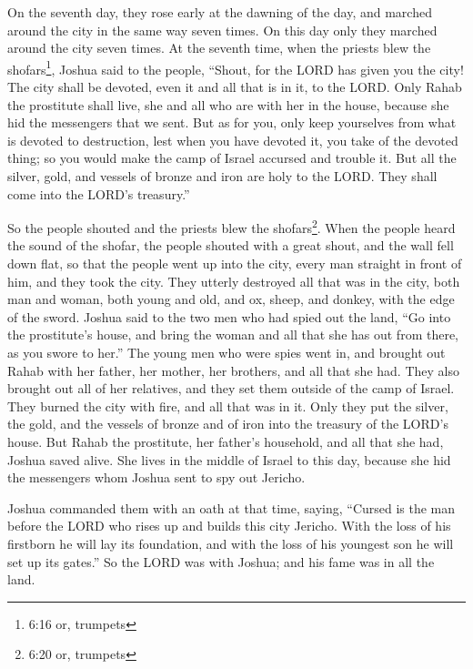 \myverse{}On the seventh day, they rose early at the dawning of the day,
and marched around the city in the same way seven times. On this day only they marched around the city
seven times.
\myverse{}At the seventh time, when the priests blew the shofars\footnote{6:16 or, trumpets},
Joshua said to the people, “Shout, for the LORD has given you the city!
\myverse{}The city shall be devoted, even it and all that is in it, to the LORD. Only
Rahab the prostitute shall live, she and all who are with her in the house, because she hid the messengers
that we sent.
\myverse{}But as for you, only keep yourselves from what is devoted to destruction,
lest when you have devoted it, you take of the devoted thing; so you would make the camp of Israel accursed
and trouble it.
\myverse{}But all the silver, gold, and vessels of bronze and iron are holy to the LORD.
They shall come into the LORD’s treasury.”

\myverse{}So the people shouted and the priests blew the shofars\footnote{6:20 or, trumpets}.
When the people heard the sound of the shofar, the people shouted with a great shout, and the wall fell
down flat, so that the people went up into the city, every man straight in front of him, and they took
the city.
\myverse{}They utterly destroyed all that was in the city, both man and woman, both
young and old, and ox, sheep, and donkey, with the edge of the sword.
\myverse{}Joshua said to the two men who had spied out the land, “Go into the prostitute’s
house, and bring the woman and all that she has out from there, as you swore to her.”
\myverse{}The young men who were spies went in, and brought out Rahab with her father,
her mother, her brothers, and all that she had. They also brought out all of her relatives, and they set
them outside of the camp of Israel.
\myverse{}They burned the city with fire, and all that was in it. Only they put the
silver, the gold, and the vessels of bronze and of iron into the treasury of the LORD’s house.
\myverse{}But Rahab the prostitute, her father’s household, and all that she had, Joshua
saved alive. She lives in the middle of Israel to this day, because she hid the messengers whom Joshua
sent to spy out Jericho.

\myverse{}Joshua commanded them with an oath at that time, saying, “Cursed
is the man before the LORD who rises up and builds this city Jericho. With the loss of his firstborn he
will lay its foundation, and with the loss of his youngest son he will set up its gates.”
\myverse{}So the LORD was with Joshua; and his fame was in all the land.


